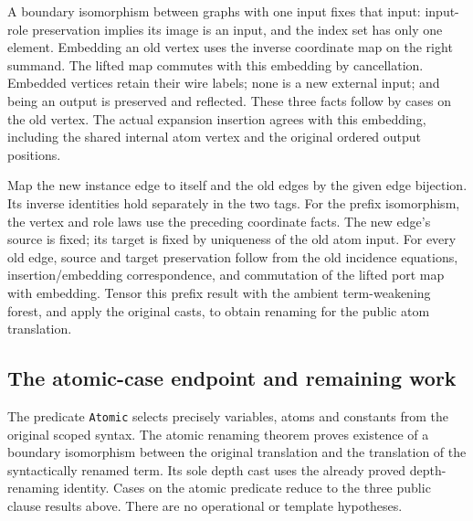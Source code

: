 
A boundary isomorphism between graphs with one input fixes that input:
input-role preservation implies its image is an input, and the index set
has only one element. Embedding an old vertex uses the inverse coordinate
map on the right summand. The lifted map commutes with this embedding by
cancellation. Embedded vertices retain their wire labels; none is a new
external input; and being an output is preserved and reflected. These three
facts follow by cases on the old vertex. The actual expansion insertion
agrees with this embedding, including the shared internal atom vertex and
the original ordered output positions.


Map the new instance edge to itself and the old edges by the given edge
bijection. Its inverse identities hold separately in the two tags. For the
prefix isomorphism, the vertex and role laws use the preceding coordinate
facts. The new edge's source is fixed; its target is fixed by uniqueness of
the old atom input. For every old edge, source and target preservation follow
from the old incidence equations, insertion/embedding correspondence, and
commutation of the lifted port map with embedding. Tensor this prefix result
with the ambient term-weakening forest, and apply the original casts, to
obtain renaming for the public atom translation.


\subsection{The atomic-case endpoint and remaining work}
The predicate \texttt{Atomic} selects precisely variables, atoms and constants
from the original scoped syntax. The atomic renaming theorem proves existence
of a boundary isomorphism between the original translation and the translation
of the syntactically renamed term. Its sole depth cast uses the already proved
depth-renaming identity. Cases on the atomic predicate reduce to the three
public clause results above. There are no operational or template hypotheses.

